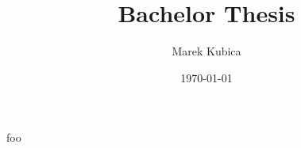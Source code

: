 \documentclass{scrartcl}
\author{Marek Kubica}
\title{Bachelor Thesis}
\date{\today}
\begin{document}
\maketitle
foo



\end{document}
